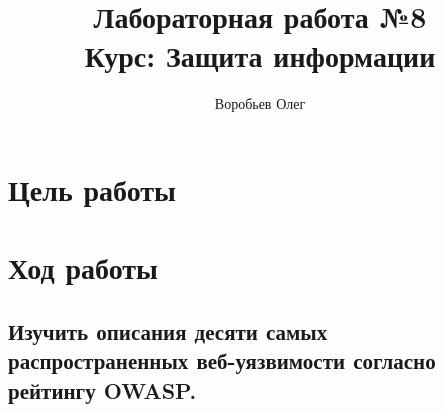 \documentclass{article}
\title{Лабораторная работа №8 \\ Курс: Защита информации}
\author{Воробьев Олег}
\begin{document}
	\maketitle
	\clearpage
	\tableofcontents
	\clearpage
\section{Цель работы}
\section{Ход работы}

\subsection{Изучить описания десяти самых распространенных веб-уязвимости согласно рейтингу OWASP.}
\end{document}
